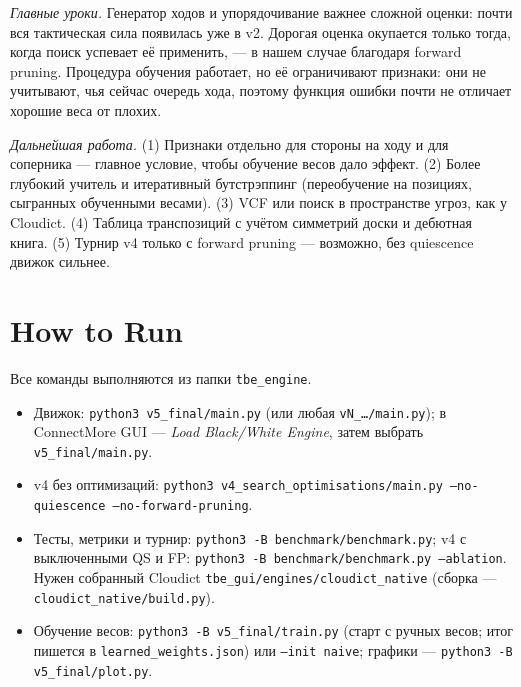 \documentclass[a4paper,10pt,twocolumn]{article}
\newcommand{\code}[1]{\texttt{#1}}
\begin{document}
\emph{Главные уроки.} Генератор ходов и упорядочивание важнее сложной оценки: почти вся тактическая сила появилась уже в v2. Дорогая оценка окупается только тогда, когда поиск успевает её применить, --- в нашем случае благодаря forward pruning. Процедура обучения работает, но её ограничивают признаки: они не учитывают, чья сейчас очередь хода, поэтому функция ошибки почти не отличает хорошие веса от плохих.

\emph{Дальнейшая работа.} (1) Признаки отдельно для стороны на ходу и для соперника --- главное условие, чтобы обучение весов дало эффект. (2) Более глубокий учитель и итеративный бутстрэппинг (переобучение на позициях, сыгранных обученными весами). (3) VCF или поиск в пространстве угроз, как у Cloudict. (4) Таблица транспозиций с учётом симметрий доски и дебютная книга. (5) Турнир v4 только с forward pruning --- возможно, без quiescence движок сильнее.




\appendix
\section{How to Run}
\raggedright
Все команды выполняются из папки \code{tbe\_engine}.
\begin{itemize}\itemsep0pt
\item Движок: \code{python3 v5\_final/main.py} (или любая \code{vN\_\ldots/main.py}); в ConnectMore GUI --- \emph{Load Black/White Engine}, затем выбрать \code{v5\_final/main.py}.
\item v4 без оптимизаций: \code{python3 v4\_search\_optimisations/main.py --no-quiescence --no-forward-pruning}.
\item Тесты, метрики и турнир: \code{python3 -B benchmark/benchmark.py}; v4 с выключенными QS и FP: \code{python3 -B benchmark/benchmark.py --ablation}. Нужен собранный Cloudict \code{tbe\_gui/engines/cloudict\_native} (сборка --- \code{cloudict\_native/build.py}).
\item Обучение весов: \code{python3 -B v5\_final/train.py} (старт с ручных весов; итог пишется в \code{learned\_weights.json}) или \code{--init naive}; графики --- \code{python3 -B v5\_final/plot.py}.
\end{itemize}
\end{document}
